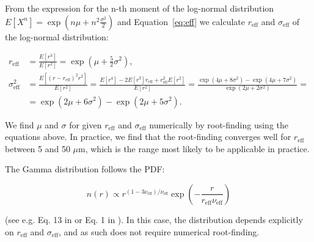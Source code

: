 From the expression for the n-th moment of the log-normal distribution
$E[X^n] = \exp(n\mu + n^2\frac{\sigma^2}{2})$ and Equation\ \eqref{eq:eff}
we calculate $r_\text{eff}$ and $\sigma_\text{eff}$ of the log-normal distribution:

\begin{align}
r_\text{eff} &= \frac{E[r^3]}{E[r^2]} = \exp(\mu + \frac{5}{2}\sigma^2) ,\\
\sigma_\text{eff}^2 &= \frac{E[(r-r_\text{eff})^2r^2]}{E[r^2]} = \frac{E[r^4] - 2E[r^3]r_\text{eff} + r_\text{eff}^2E[r^2]}{E[r^2]} = \frac{\exp(4\mu + 8\sigma^2) - \exp(4\mu + 7\sigma^2)}{\exp(2\mu + 2\sigma^2)} = \nonumber\\
&= \exp(2\mu + 6\sigma^2) - \exp(2\mu + 5\sigma^2).
\end{align}

\noindent
We find $\mu$ and $\sigma$ for given $r_\text{eff}$ and $\sigma_\text{eff}$
numerically by root-finding using the equations above. In practice,
we find that the root-finding converges well for $r_\text{eff}$ between 5
and 50 $\mu$m, which is the range most likely to be applicable in practice.

The Gamma distribution follows the PDF:

\begin{equation}
n(r) \propto r^{(1 - 3\nu_\text{eff})/\nu_\text{eff}}\exp\left(-\frac{r}{r_\text{eff}\nu_\text{eff}}\right)
\end{equation}

\noindent
(see e.g. Eq. 13 in \cite{petty2011}
or Eq. 1 in \cite{breon2005}). In this case, the distribution depends explicitly on $r_\text{eff}$ and
$\sigma_\text{eff}$, and as such does not require numerical root-finding.

